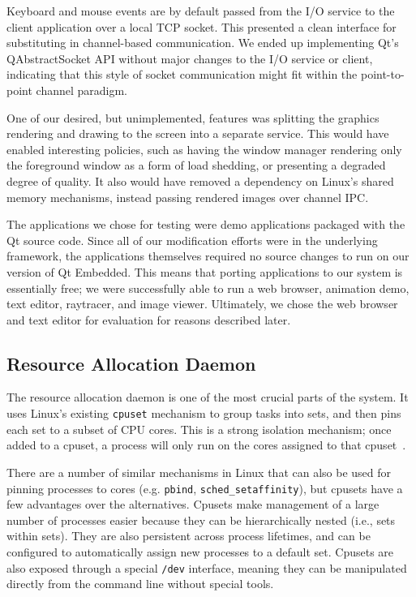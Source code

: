 \documentclass[letterpaper,twocolumn,11pt]{article}
\begin{document}
Keyboard and mouse events are by default passed from the I/O service to the client application over a local TCP socket. This presented a clean interface for substituting in channel-based communication. We ended up implementing Qt's QAbstractSocket API without major changes to the I/O service or client, indicating that this style of socket communication might fit within the point-to-point channel paradigm.

One of our desired, but unimplemented, features was splitting the graphics rendering and drawing to the screen into a separate service. This would have enabled interesting policies, such as having the window manager rendering only the foreground window as a form of load shedding, or presenting a degraded degree of quality. It also would have removed a dependency on Linux's shared memory mechanisms, instead passing rendered images over channel IPC.

The applications we chose for testing were demo applications packaged with the Qt source code. Since all of our modification efforts were in the underlying framework, the applications themselves required no source changes to run on our version of Qt Embedded. This means that porting applications to our system is essentially free; we were successfully able to run a web browser, animation demo, text editor, raytracer, and image viewer. Ultimately, we chose the web browser and text editor for evaluation for reasons described later.

\subsection{Resource Allocation Daemon}

The resource allocation daemon is one of the most crucial parts of the system. It uses Linux's existing {\tt cpuset} mechanism to group tasks into sets, and then pins each set to a subset of CPU cores. This is a strong isolation mechanism; once added to a cpuset, a process will only run on the cores assigned to that cpuset~\cite{cpusets}.

There are a number of similar mechanisms in Linux that can also be used for pinning processes to cores (e.g. {\tt pbind}, {\tt sched\_setaffinity}), but cpusets have a few advantages over the alternatives. Cpusets make management of a large number of processes easier because they can be hierarchically nested (i.e., sets within sets). They are also persistent across process lifetimes, and can be configured to automatically assign new processes to a default set. Cpusets are also exposed through a special {\tt /dev} interface, meaning they can be manipulated directly from the command line without special tools.
\end{document}
